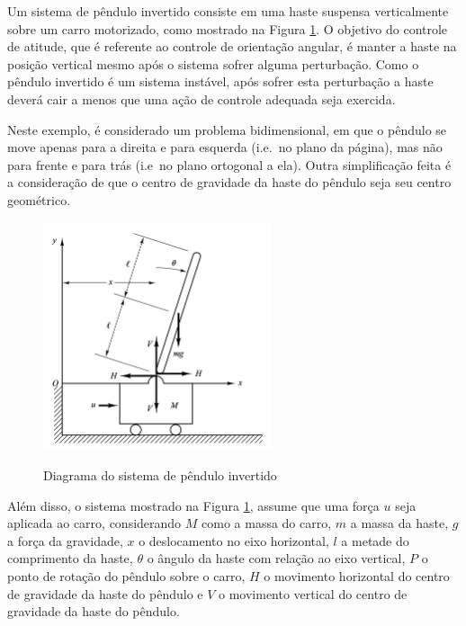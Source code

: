 Um sistema de pêndulo invertido consiste em uma haste suspensa verticalmente sobre um carro motorizado, como mostrado na Figura \ref{fig:diagrama-pendulo-invertido}. O objetivo do controle de atitude, que é referente ao controle de orientação angular, é manter a haste na posição vertical mesmo após o sistema sofrer alguma perturbação. Como o pêndulo invertido é um sistema instável, após sofrer esta perturbação a haste deverá cair a menos que uma ação de controle adequada seja exercida.

Neste exemplo, é considerado um problema bidimensional, em que o pêndulo se move apenas para a direita e para esquerda (i.e.\ no plano da página), mas não para frente e para trás (i.e\ no plano ortogonal a ela). Outra simplificação feita é a consideração de que o centro de gravidade da haste do pêndulo seja seu centro geométrico.

\begin{figure}[!htb]
    \centering
    \caption{Diagrama do sistema de pêndulo invertido}
    \includegraphics[width=0.6\textwidth]{./04-figuras/sistemas-nao-lineares/diagrama-pendulo-invertido}
    \label{fig:diagrama-pendulo-invertido}
\end{figure}

Além disso, o sistema mostrado na Figura \ref{fig:diagrama-pendulo-invertido}, assume que uma força $u$ seja aplicada ao carro, considerando $M$ como a massa do carro, $m$ a massa da haste, $g$ a força da gravidade, $x$ o deslocamento no eixo horizontal, $l$ a metade do comprimento da haste, $\theta$ o ângulo da haste com relação ao eixo vertical, $P$ o ponto de rotação do pêndulo sobre o carro, $H$ o movimento horizontal do centro de gravidade da haste do pêndulo e $V$ o movimento vertical do centro de gravidade da haste do pêndulo.

